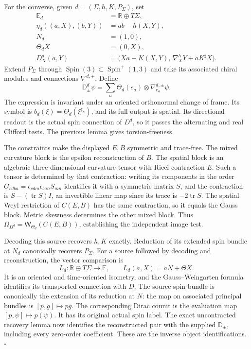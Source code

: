 \documentclass[
  english,
  11pt,
  reqno]{amsart}
\begin{document}
For the converse, given \(d=(\Sigma,h,K,P_\Sigma)\), set%
 \[
\begin{aligned}
\mathbb E_d&=\mathbb R\oplus T\Sigma, \\
\eta_d((a,X),(b,Y))&=ab-h(X,Y), \\
N_d&=(1,0), \\
\Theta_dX&=(0,X), \\
D_X^d(a,Y)&=\bigl(Xa+K(X,Y),\,
                    \nabla_X^hY+aK^\sharp X\bigr).
\end{aligned}
\] Extend \(P_\Sigma\) through
\(\operatorname{Spin}(3)\subset\operatorname{Spin}^{+}(1,3)\) and take
its associated chiral modules and connections \(\nabla^{d,\pm}\). Define%
 \[
\mathbb D_\pm^d\psi
=\sum_a\Theta_d(e_a)\otimes\nabla^{d,\pm}_{e_a}\psi.
\] The expression is invariant under an oriented orthonormal change of
frame. Its symbol is \(b_d(\xi)=\Theta_d(\xi^{\sharp_h})\), and its full
output is spatial. Its directional readout is the actual spin connection
of \(D^d\), so it passes the alternating and real Clifford tests. The
previous lemma gives torsion-freeness.

The constraints make the displayed \(E,B\) symmetric and trace-free. The
mixed curvature block is the epsilon reconstruction of \(B\). The
spatial block is an algebraic three-dimensional curvature tensor with
Ricci contraction \(E\). Such a tensor is determined by that
contraction: writing its components in the order
\(G_{cdba}=\epsilon_{cdm}\epsilon_{ban}S_{mn}\) identifies it with a
symmetric matrix \(S\), and the contraction is
\(S-(\operatorname{tr}S)I\), an invertible linear map since its trace is
\(-2\operatorname{tr}S\). The spatial Weyl restriction of \(C(E,B)\) has
the same contraction, so it equals the Gauss block. Metric skewness
determines the other mixed block. Thus
\(\Omega_{D^d}=\mathsf W_{\Theta_d}(C(E,B))\), establishing the
independent image test.

Decoding this source recovers \(h,K\) exactly. Reduction of its extended
spin bundle at \(N_d\) canonically recovers \(P_\Sigma\). For a source
followed by decoding and reconstruction, the vector comparison is%
 \[
L_d:\mathbb R\oplus T\Sigma\longrightarrow\mathbb E,
\qquad L_d(a,X)=aN+\Theta X.
\] It is an oriented and time-oriented isometry, and the
Gauss--Weingarten formula identifies its transported connection with
\(D\). The source spin bundle is canonically the extension of its
reduction at \(N\): the map on associated principal bundles is
\([p,g]\mapsto p g\). The corresponding Dirac counit is the evaluation
map \([p,\psi]\mapsto p(\psi)\). It has its original actual spin label.
The exact uncontracted recovery lemma now identifies the reconstructed
pair with the supplied \(\mathbb D_\pm\), including every zero-order
coefficient. These are the inverse object identifications.
\hfill\(\square\)
\end{document}
